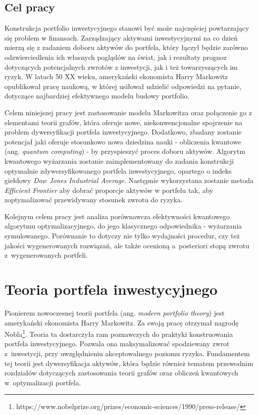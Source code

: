 \documentclass[12pt,a4paper,twoside,openany]{book}
\begin{document}
\section{Cel pracy}
Konstrukcja portfolio inwestycyjnego stanowi być może najczęściej powtarzający się problem w finansach.
Zarządzający aktywami inwestycyjnymi na co dzień mierzą się z zadaniem doboru aktywów do portfela, który łączył będzie zarówno odzwierciedlenia ich własnych poglądów na świat, jak i rezultaty prognoz dotyczących potencjalnych zwrotów z inwestycji, jak i też towarzyszących im ryzyk.
W latach 50 XX wieku, amerykański ekonomista Harry Markowitz opublikował pracę naukową, w której usiłował udzielić odpowiedzi na pytanie, dotyczące najbardziej efektywnego modelu budowy portfolio. 

Celem niniejszej pracy jest zastosowanie modelu Markowitza oraz połączenie go z elementami teorii grafów, która oferuje nowe, niekonwencjonalne spojrzenie na problem dywersyfikacji portfela inwestycyjnego.
Dodatkowo, zbadany zostanie potencjał jaki oferuje stosunkowo nowa dziedzina nauki - obliczenia kwantowe (ang. \textit{quantum computing}) - by przyspieszyć proces doboru aktywów.
Algorytm kwantowego wyżarzania zostanie zaimplementowany do zadania konstrukcji optymalnie zdywersyfikowanego portfela inwestycyjnego, opartego o indeks giełdowy \textit{Dow Jones Industrial Average}.
Następnie wykorzystana zostanie metoda \textit{Efficient Frontier} aby dobrać proporcje aktywów w portfelu tak, aby zoptymalizować przewidywany stosunek zwrotu do ryzyka.

Kolejnym celem pracy jest analiza porównawcza efektywności kwantowego algorytmu optymalizacyjnego, do jego klasycznego odpowiednika - wyżarzania symulowanego.
Porównanie to dotyczy nie tylko wydajności procedur, czy też jakości wygenerowanych rozwiązań, ale także ocenioną a~posteriori stopą zwrotu z~wygenerowanych portfeli.

\chapter{Teoria portfela inwestycyjnego}
\label{sec:ntp}

Pionierem nowoczesnej teorii portfela (ang. \textit{modern portfolio theory}) jest amerykański ekonomista Harry Markowitz. 
Za swoją pracę otrzymał nagrodę Nobla\footnote{https://www.nobelprize.org/prizes/economic-sciences/1990/press-release/}.
Teoria ta dostarczyła ram poznawczych do praktyki konstruowania portfela inwestycyjnego. 
Pozwala ona maksymalizować spodziewany zwrot z~inwestycji, przy uwzględnieniu akceptowalnego poziomu ryzyka. 
Fundamentem tej teorii jest dywersyfikacja aktywów, która będzie również tematem przewodnim rozdziałów dotyczących zastosowania teorii grafów oraz obliczeń kwantowych w~optymalizacji portfela. 
\end{document}
